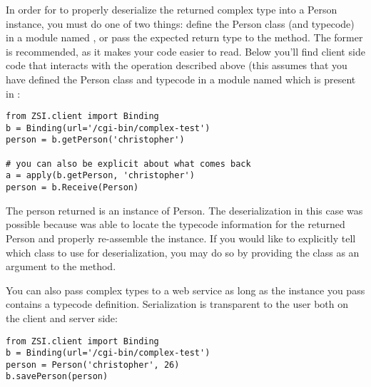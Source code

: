 In order for \ZSI{} to properly deserialize the returned complex type into
a Person instance, you must do one of two things: define the Person class (and
typecode) in a module named , or pass the expected return
type to the  method.  The former is recommended, as it
makes your code easier to read.  Below you'll find client side code that
interacts with the  operation described above (this assumes
that you have defined the Person class and typecode in a module named 
 which is present in :

\begin{verbatim}
from ZSI.client import Binding
b = Binding(url='/cgi-bin/complex-test')
person = b.getPerson('christopher')

# you can also be explicit about what comes back
a = apply(b.getPerson, 'christopher')
person = b.Receive(Person)
\end{verbatim}

The person returned is an instance of Person.  The deserialization in this
case was possible because \ZSI{} was able to locate the typecode information
for the returned Person and properly re-assemble the instance.  If you would
like to explicitly tell \ZSI{} which class to use for deserialization, you
may do so by providing the class as an argument to the  method.

You can also pass complex types to a web service as long as the instance you
pass contains a typecode definition.  Serialization is transparent to the
user both on the client and server side:

\begin{verbatim}
from ZSI.client import Binding
b = Binding(url='/cgi-bin/complex-test')
person = Person('christopher', 26)
b.savePerson(person)
\end{verbatim}


